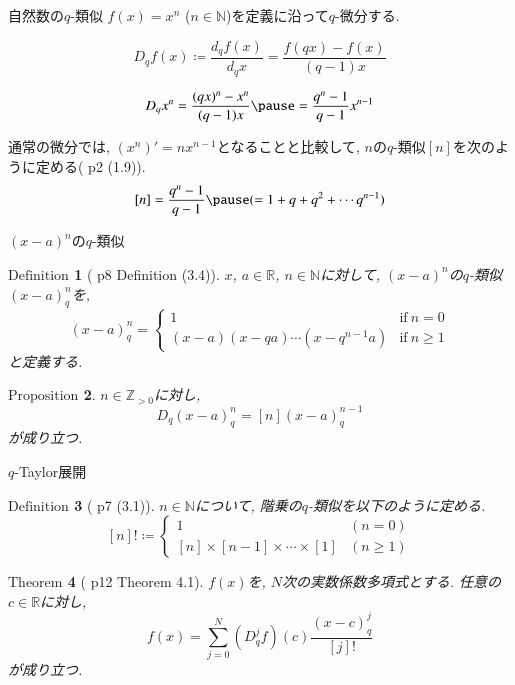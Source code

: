 \documentclass[dvipdfmx,cjk]{beamer}
\theoremstyle{mystyle}
\newtheorem{df}{$\textrm{Definition}$}[section]
\newtheorem{prop}[df]{$\textrm{Proposition}$}
\newtheorem{thm}[df]{$\textrm{Theorem}$}
\newcommand{\N}{\mathbb{N}}
\newcommand{\Z}{\mathbb{Z}}
\newcommand{\R}{\mathbb{R}}
\newcommand{\0}{\textbf{0}}
\begin{document}
\begin{frame}{自然数の$q$-類似}
	$f(x) = x^n$ ($n \in \N$)を定義に沿って$q$-微分する. \pause
	\begin{screen}
		\[
			D_q f(x) \coloneqq \frac{d_q f(x)}{d_q x} = \frac{f(qx) - f(x)}{(q - 1) x}
		\]
	\end{screen} \pause
	\[
		D_q x^n = \frac{(qx)^n - x^n}{(q - 1) x} \pause
					= \frac{q^n - 1}{q - 1} x^{n - 1}
	\] \pause
  
  通常の微分では, $(x^n)' = n x^{n - 1}$となることと比較して, 
  $n$の$q$-類似$[n]$を次のように定める(\cite{Kac} p2 (1.9)). \pause
  \[
    [n] = \frac{q^n - 1}{q - 1} \pause
    (= 1 + q + q^2 + \cdots q^{n - 1})
  \]
\end{frame}

\begin{frame}{$(x - a)^n$の$q$-類似} 
	\begin{df}[\cite{Kac} p8 Definition (3.4)]
	  $x$, $a \in \R$, $n \in \N$に対して, $(x - a)^n$の$q$-類似$(x - a)^n_q$を, 
	  \[
	  (x - a)^n_q = \begin{cases}
	                      1 & \text{if}\ n = 0 \\
	                      (x - a) (x - qa) \cdots (x - q^{n - 1} a) & \text{if}\ n \ge 1
	                    \end{cases}
	  \]
	  と定義する. 
	\end{df} \pause
	\begin{prop} \label{Dq_qbinom_nonneg}
	  $n\in\Z_{>0}$に対し, 
	  \[
	    D_q(x-a)^n_q = [n](x-a)^{n-1}_q
	  \]
	  が成り立つ. 
	\end{prop}
\end{frame}

\begin{frame}{$q$-Taylor展開}
	\begin{df}[\cite{Kac} p7 (3.1)]
		$n \in \N$について, 階乗の$q$-類似を以下のように定める. 
    \[
      [n]! \coloneqq \begin{cases}
                            1 & (n=0)\\
                            [n]\times[n-1]\times\cdots\times[1] & (n\ge1)
                          \end{cases}
    \]
  \end{df} \pause
  \begin{thm}[\cite{Kac} p12 Theorem 4.1] \label{q_Taylor}
	 $f(x)$を, $N$次の実数係数多項式とする. 任意の$c\in\R$に対し, 
	 \[
	   f(x) = \sum_{j=0}^N (D_q^jf)(c)\frac{(x-c)^j_q}{[j]!}
	 \]
	 が成り立つ. 
  \end{thm}
\end{frame}
\end{document}
